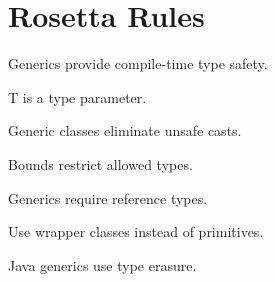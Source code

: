 \documentclass[11pt,a4paper]{book}
\begin{document}
\section{Rosetta Rules}

\begin{rosettarule}

Generics provide compile-time
type safety.

\end{rosettarule}


\begin{rosettarule}

T is a type parameter.

\end{rosettarule}


\begin{rosettarule}

Generic classes eliminate unsafe casts.

\end{rosettarule}


\begin{rosettarule}

Bounds restrict allowed types.

\end{rosettarule}


\begin{rosettarule}

Generics require reference types.

\end{rosettarule}


\begin{rosettarule}

Use wrapper classes instead
of primitives.

\end{rosettarule}


\begin{rosettarule}

Java generics use type erasure.

\end{rosettarule}
\end{document}
